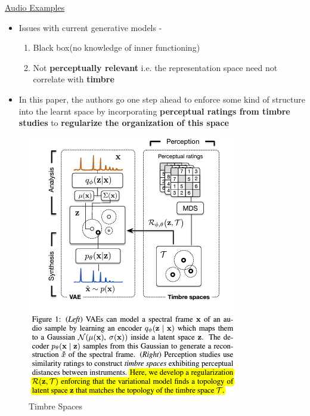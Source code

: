 \documentclass[11pt]{article}
\makeatletter
\def\maxwidth{\ifdim\Gin@nat@width>\linewidth\linewidth
    \else\Gin@nat@width\fi}
\let\Oldincludegraphics\includegraphics
\renewcommand{\includegraphics}[1]{\Oldincludegraphics[width=.8\maxwidth]{#1}}
\providecommand{\tightlist}{%
      \setlength{\itemsep}{0pt}\setlength{\parskip}{0pt}}
\makeatother
\begin{document}
\href{https://acids-ircam.github.io/variational-timbre/}{Audio Examples}

    \begin{itemize}
\tightlist
\item
  Issues with current generative models -

  \begin{enumerate}
  \def\labelenumi{\arabic{enumi}.}
  \tightlist
  \item
    Black box(no knowledge of inner functioning)
  \item
    Not \textbf{perceptually relevant} i.e. the representation space
    need not correlate with \textbf{timbre}
  \end{enumerate}
\item
  In this paper, the authors go one step ahead to enforce some kind of
  structure into the learnt space by incorporating \textbf{perceptual
  ratings from timbre studies} to \textbf{regularize the organization of
  this space}
\end{itemize}

    \begin{figure}
\centering
\includegraphics{fig_06.PNG}
\caption{Timbre Spaces}
\end{figure}
\end{document}
